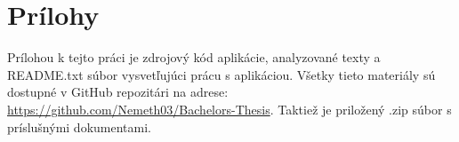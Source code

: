 \chapter*{Prílohy}\label{app:prilohy}

Prílohou k tejto práci je zdrojový kód aplikácie, analyzované texty a README.txt súbor vysvetľujúci prácu s aplikáciou. Všetky tieto materiály sú dostupné
v GitHub repozitári na adrese: \url{https://github.com/Nemeth03/Bachelors-Thesis}. Taktiež je priložený .zip súbor s príslušnými dokumentami.

